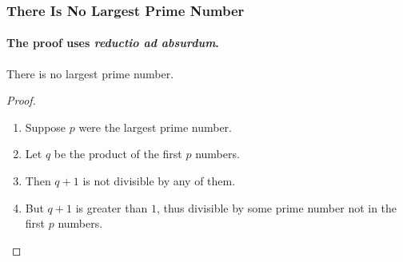 \documentclass[]{beamer} %
\begin{document}
\begin{frame}
	\frametitle{There Is No Largest Prime Number}
	\framesubtitle{The proof uses \textit{reductio ad absurdum}.}
	\begin{theorem}
		There is no largest prime number.
	\end{theorem}
	\begin{proof}
		\begin{enumerate}
			\item<1-> Suppose $p$ were the largest prime number.
			\item<2-> Let $q$ be the product of the first $p$ numbers.
			\item<3-> Then $q + 1$ is not divisible by any of them.
			\item<1-> But $q + 1$ is greater than $1$, thus divisible by some prime
			number not in the first $p$ numbers.\qedhere
		\end{enumerate}
	\end{proof}
\end{frame}	
	
	
\end{document}
